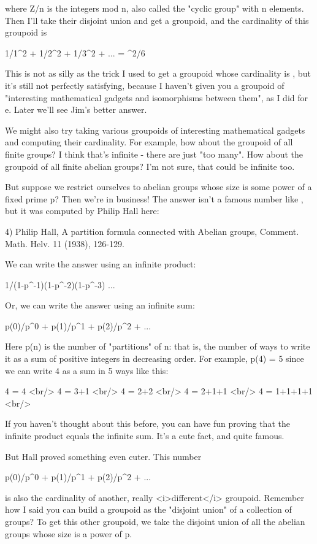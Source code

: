 where Z/n is the integers mod n, also called the "cyclic group"
with n elements.  Then I'll take their disjoint union and get a
groupoid, and the cardinality of this groupoid is

1/1^{2} + 1/2^{2} + 1/3^{2} + ... = \pi ^{2}/6

This is not as silly as the trick I used to get a groupoid whose
cardinality is \pi , but it's still not perfectly satisfying, because
I haven't given you a groupoid of "interesting mathematical gadgets
and isomorphisms between them", as I did for e.  Later we'll see Jim's
better answer.

We might also try taking various groupoids of interesting
mathematical gadgets and computing their cardinality.  For example,
how about the groupoid of all finite groups?  I think that's infinite
- there are just "too many".  How about the groupoid of all finite
abelian groups?  I'm not sure, that could be infinite too.

But suppose we restrict ourselves to abelian groups whose size is
some power of a fixed prime p?  Then we're in business!  The answer
isn't a famous number like \pi , but it was computed by Philip Hall
here:

4) Philip Hall, A partition formula connected with Abelian groups,
Comment. Math. Helv. 11 (1938), 126-129.

We can write the answer using an infinite product:

1/(1-p^{-1})(1-p^{-2})(1-p^{-3}) ...

Or, we can write the answer using an infinite sum:

p(0)/p^{0} + p(1)/p^{1} + p(2)/p^{2} + ...

Here p(n) is the number of "partitions" of n: that is, the number
of ways to write it as a sum of positive integers in decreasing order.
For example, p(4) = 5 since we can write 4 as a sum in 5 ways like
this:

4 = 4  <br/>
4 = 3+1  <br/>
4 = 2+2   <br/>
4 = 2+1+1   <br/>
4 = 1+1+1+1   <br/>

If you haven't thought about this before, you can have fun proving
that the infinite product equals the infinite sum.  It's a cute fact,
and quite famous.

But Hall proved something even cuter. This number

p(0)/p^{0} + p(1)/p^{1} + p(2)/p^{2} + ...

is also the cardinality of another, really <i>different</i>
groupoid.  Remember how I said you can build a groupoid as the
"disjoint union" of a collection of groups?  To get this other
groupoid, we take the disjoint union of all the abelian groups whose
size is a power of p.

